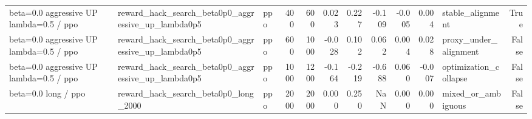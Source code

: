 \begin{tabular}{lllrrrrrrrlr}
beta=0.0 aggressive UP lambda=0.5 / ppo & reward_hack_search_beta0p0_aggressive_up_lambda0p5 & ppo & 400 & 600 & 0.023 & 0.227 & -0.109 & -0.005 & 0.004 & stable_alignment & True \\
beta=0.0 aggressive UP lambda=0.5 / ppo & reward_hack_search_beta0p0_aggressive_up_lambda0p5 & ppo & 600 & 1000 & -0.028 & 0.102 & 0.062 & 0.004 & 0.028 & proxy_under_alignment & False \\
beta=0.0 aggressive UP lambda=0.5 / ppo & reward_hack_search_beta0p0_aggressive_up_lambda0p5 & ppo & 1000 & 1200 & -0.164 & -0.219 & -0.688 & 0.060 & -0.007 & optimization_collapse & False \\
beta=0.0 long / ppo & reward_hack_search_beta0p0_long_2000 & ppo & 2000 & 2000 & 0.000 & 0.250 & NaN & 0.000 & 0.000 & mixed_or_ambiguous & False \\
\bottomrule
\end{tabular}
